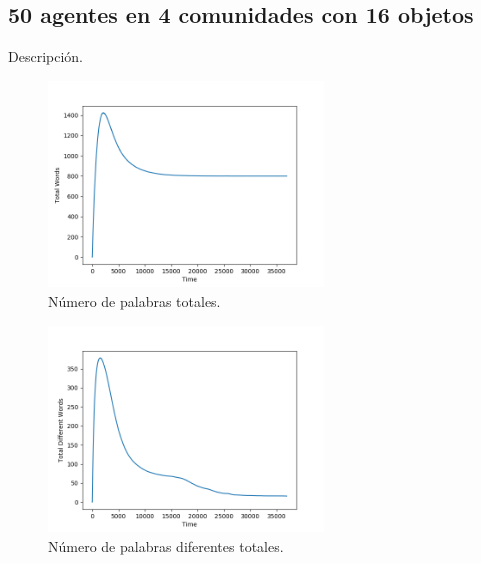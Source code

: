 \documentclass[runningheads]{llncs}
\begin{document}
\subsection{50 agentes en 4 comunidades con 16 objetos}
Descripción.
\begin{figure}[h]
	\centering
	\includegraphics[width=0.65\textwidth]{Figure_311_TotalWords.png}
	\caption{Número de palabras totales.}
	\label{fig_004}
\end{figure}
\begin{figure}[h]
	\centering
	\includegraphics[width=0.65\textwidth]{Figure_311_TotalDifferentWords.png}
	\caption{Número de palabras diferentes totales.}
	\label{fig_005}
\end{figure}
\pagebreak
\\
\end{document}
